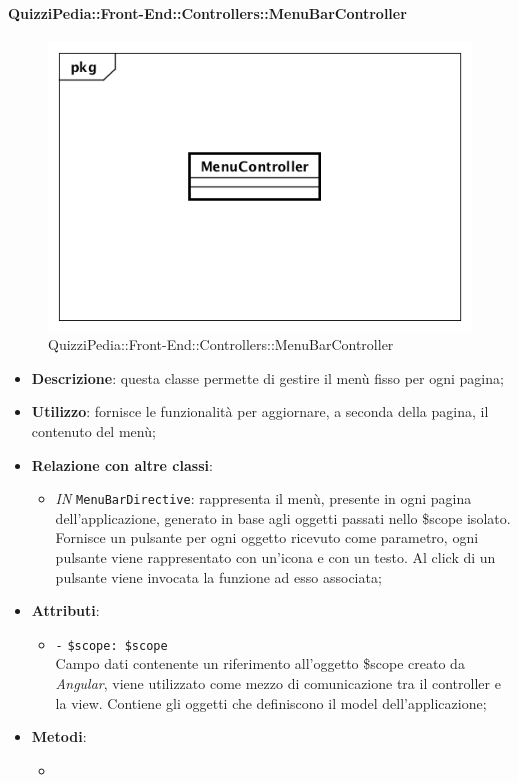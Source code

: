 \paragraph{QuizziPedia::Front-End::Controllers::MenuBarController}
\begin{figure} [ht]
	\centering
	\includegraphics[scale=0.45]{UML/Classi/Front-End/QuizziPedia_Front-end_Controller_MenuBarController.png}
	\caption{QuizziPedia::Front-End::Controllers::MenuBarController}
\end{figure} \FloatBarrier
\begin{itemize}
	\item \textbf{Descrizione}: questa classe permette di gestire il menù fisso per ogni pagina;
	\item \textbf{Utilizzo}: fornisce le funzionalità per aggiornare, a seconda della pagina, il contenuto del menù;
	\item \textbf{Relazione con altre classi}:
	\begin{itemize}
		\item \textit{IN} \texttt{MenuBarDirective}: rappresenta il menù, presente in ogni pagina dell'applicazione, generato in base agli oggetti passati nello \$scope isolato. Fornisce un pulsante per ogni oggetto ricevuto come parametro, ogni pulsante viene rappresentato con un’icona e con un testo. Al click di un pulsante viene invocata la funzione ad esso associata;  
	\end{itemize}
	\item \textbf{Attributi}:
	\begin{itemize}
		\item \texttt{-} \texttt{\$scope: \$scope} \\
		Campo dati contenente un riferimento all’oggetto \$scope creato da \textit{Angular}, viene utilizzato come mezzo di comunicazione tra il controller e la view. Contiene gli oggetti che definiscono il model dell’applicazione;
	\end{itemize}
	\item \textbf{Metodi}:
	\begin{itemize}
		\item 
	\end{itemize}
\end{itemize}

